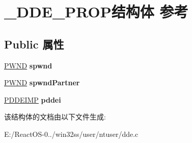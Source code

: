 \hypertarget{struct___d_d_e___p_r_o_p}{}\section{\+\_\+\+D\+D\+E\+\_\+\+P\+R\+O\+P结构体 参考}
\label{struct___d_d_e___p_r_o_p}
\subsection*{Public 属性}
\begin{DoxyCompactItemize}
\item 
\mbox{\label{struct___d_d_e___p_r_o_p_a20093b6bfa96ab4738477f1b41c5e1a8}} 
\hyperlink{struct___w_n_d}{P\+W\+ND} {\bfseries spwnd}
\item 
\mbox{\label{struct___d_d_e___p_r_o_p_ab504f9e0bf3d5bf15172f1c4490b2d19}} 
\hyperlink{struct___w_n_d}{P\+W\+ND} {\bfseries spwnd\+Partner}
\item 
\mbox{\label{struct___d_d_e___p_r_o_p_ad3d58593ad3e0336119d87fce40b7cd7}} 
\hyperlink{struct___d_d_e_i_m_p}{P\+D\+D\+E\+I\+MP} {\bfseries pddei}
\end{DoxyCompactItemize}


该结构体的文档由以下文件生成\+:\begin{DoxyCompactItemize}
\item 
E\+:/\+React\+O\+S-\/0../win32ss/user/ntuser/dde.\+c\end{DoxyCompactItemize}
